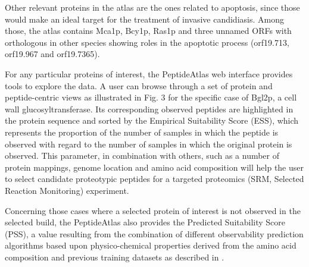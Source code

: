 Other relevant proteins in the atlas are the ones related to
apoptosis, since those would make an ideal target for the
treatment of invasive candidiasis. Among those, the atlas
contains Mca1p, Bcy1p, Ras1p and three unnamed ORFs with
orthologous in other species showing roles in the apoptotic
process (orf19.713, orf19.967 and orf19.7365).


For any particular proteins of interest, the PeptideAtlas
web interface provides tools to explore the data. A user can
browse through a set of protein and peptide-centric views as
illustrated in Fig. 3 for the specific case of Bgl2p, a cell wall
glucosyltransferase. Its corresponding observed peptides are
highlighted in the protein sequence and sorted by the
Empirical Suitability Score (ESS), which represents the proportion
 of the number of samples in which the peptide is
observed with regard to the number of samples in which the
original protein is observed. This parameter, in combination
with others, such as a number of protein mappings, genome
location and amino acid composition will help the user to
select candidate proteotypic peptides for a targeted proteomics
 (SRM, Selected Reaction Monitoring) experiment.




Concerning those cases where a selected protein of
interest is not observed in the selected build, the PeptideAtlas
also provides the Predicted Suitability Score (PSS), a value
resulting from the combination of different observability
prediction algorithms based upon physico-chemical properties
 derived from the amino acid composition and previous
training datasets as described in \citep{Mallick2007}.

